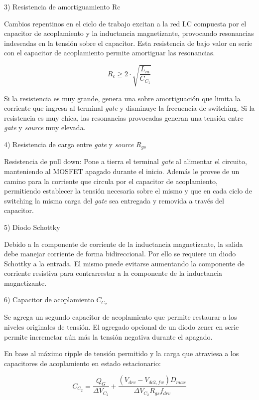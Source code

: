 
3) Resistencia de amortiguamiento Rc

Cambios repentinos en el ciclo de trabajo excitan a la red LC compuesta por el capacitor de acoplamiento 
y la inductancia magnetizante, provocando resonancias indeseadas en la tensión sobre el capacitor. 
Esta resistencia de bajo valor en serie con el capacitor de acoplamiento permite amortiguar las resonancias. 

$$ R_c\geq2\cdot\sqrt{\frac{L_m}{C_{C_1}}} $$

Si la resistencia es muy grande, genera una sobre amortiguación que limita la corriente que ingresa al terminal \textit{gate} y disminuye la frecuencia de switching. 
Si la resistencia es muy chica, las resonancias provocadas generan una tensión entre \textit{gate} y \textit{source} muy elevada.

4) Resistencia de carga entre \textit{gate} y \textit{source} $R_{gs}$

Resistencia de pull down: Pone a tierra el terminal \textit{gate} al alimentar el circuito, manteniendo al MOSFET apagado durante el inicio. 
Además le provee de un camino para la corriente que circula por el capacitor de acoplamiento, 
permitiendo establecer la tensión necesaria sobre el mismo y que en cada ciclo de switching 
la misma carga del \textit{gate} sea entregada y removida a través del capacitor. 

5) Diodo Schottky 

Debido a la componente de corriente de la inductancia magnetizante, la salida debe manejar corriente de forma bidireccional. 
Por ello se requiere un diodo Schottky a la entrada. 
El mismo puede evitarse aumentando la componente de corriente resistiva para contrarrestar a la componente de la inductancia magnetizante. 

6) Capacitor de acoplamiento $C_{C_2}$  

Se agrega un segundo capacitor de acoplamiento que permite restaurar a los niveles originales de tensión. 
El agregado opcional de un diodo zener en serie permite incremetar aún más la tensión negativa durante el apagado. 

En base al máximo ripple de tensión permitido y la carga que atraviesa a los capacitores de acoplamiento en estado estacionario:

$$ C_{C_2}=\frac{Q_G}{\Delta V_{C_2}}+\frac{(V_{drv}-V_{dc2,fw})D_{max}}{\Delta V_{C_2}R_{gs}f_{drv}} $$

